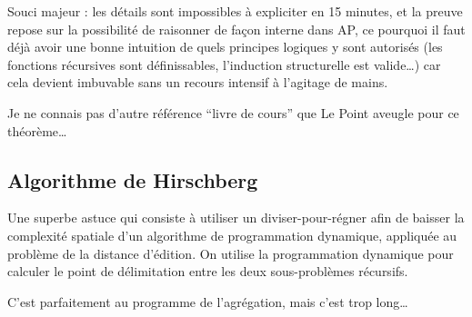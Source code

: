 \documentclass[a4paper, 11pt]{article}
\begin{document}
Souci majeur : les détails sont impossibles à expliciter en 15 minutes, et la
preuve repose sur la possibilité de raisonner de façon interne dans AP, ce
pourquoi il faut déjà avoir une bonne intuition de quels principes logiques y
sont autorisés (les fonctions récursives sont définissables, l'induction
structurelle est valide…) car cela devient imbuvable sans un recours intensif à
l'agitage de mains.

Je ne connais pas d'autre référence \enquote{livre de cours} que Le Point
aveugle pour ce théorème…

\subsection{Algorithme de Hirschberg}

Une superbe astuce qui consiste à utiliser un diviser-pour-régner afin de
baisser la complexité spatiale d'un algorithme de programmation dynamique,
appliquée au problème de la distance d'édition. On utilise la programmation
dynamique pour calculer le point de délimitation entre les deux sous-problèmes
récursifs.

C'est parfaitement au programme de l'agrégation, mais c'est trop long…
\end{document}
